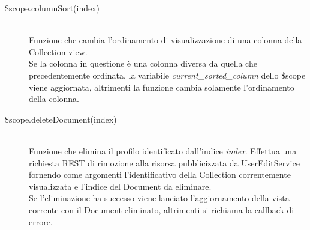 \begin{description}
\begin{description}
  \item[\$scope.columnSort(index)] \hfill \\
  Funzione che cambia l'ordinamento di visualizzazione di una colonna della Collection view. \\
  Se la colonna in questione è una colonna diversa da quella che precedentemente ordinata,
  la variabile \emph{current\_sorted\_column} dello \$scope viene aggiornata, altrimenti la funzione cambia solamente
  l'ordinamento della colonna.
  
  \item[\$scope.deleteDocument(index)] \hfill \\
  Funzione che elimina il profilo identificato dall'indice \emph{index}. Effettua una richiesta REST di rimozione alla risorsa
  pubblicizzata da UserEditService fornendo come argomenti l'identificativo della Collection correntemente visualizzata e l'indice
  del Document da eliminare. \\
  Se l'eliminazione ha successo viene lanciato l'aggiornamento della vista corrente con il Document eliminato, altrimenti si
  richiama la callback di errore.
  
 \end{description}
\end{description}

